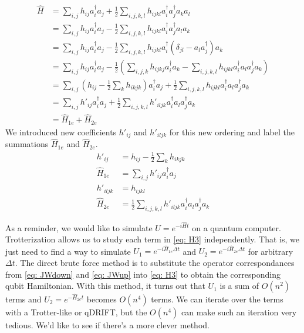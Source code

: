 \begin{equation}
    \begin{split}
        \hat{H} &= \sum_{i, j} h_{ij}a^\dag_ia_j + \frac{1}{2}\sum_{i,j,k,l} h_{ijkl}a^\dag_ia^\dag_ja_ka_l \\
        &= \sum_{i, j} h_{ij}a^\dag_ia_j - \frac{1}{2}\sum_{i,j,k,l} h_{ijkl}a^\dag_ia^\dag_ja_la_k \\
        &= \sum_{i, j} h_{ij}a^\dag_ia_j - \frac{1}{2}\sum_{i,j,k,l} h_{ijkl}a^\dag_i(\delta_{jl} - a_la^\dag_j)a_k \\
        &= \sum_{i, j} h_{ij}a^\dag_ia_j - \frac{1}{2}\left(\sum_{i, j, k}h_{ijkj}a^\dag_ia_k - \sum_{i,j,k,l} h_{ijkl}a^\dag_ia_la^\dag_ja_k\right) \\
        &= \sum_{i, j} (h_{ij} - \frac{1}{2}\sum_k h_{ikjk})a^\dag_ia_j + \frac{1}{2}\sum_{i,j,k,l} h_{ijkl}a^\dag_ia_la^\dag_ja_k \\
        &= \sum_{i, j} h'_{ij}a^\dag_ia_j + \frac{1}{2}\sum_{i,j,k,l} h'_{iljk}a^\dag_ia_la^\dag_ja_k \\
        &= \hat{H}_{1e} + \hat{H}_{2e}
    \end{split}
    \label{eq: H3}
\end{equation}
We introduced new coefficients $h'_{ij}$ and $h'_{iljk}$ for this new ordering and label the summations $\hat{H}_{1e}$ and $\hat{H}_{2e}$.
\begin{equation}
    \begin{split}
        h'_{ij} &= h_{ij} - \frac{1}{2}\sum_k h_{ikjk} \\
        \hat{H}_{1e} &= \sum_{i, j} h'_{ij}a^\dag_ia_j \\
        h'_{iljk} &= h_{ijkl} \\
        \hat{H}_{2e} &= \frac{1}{2}\sum_{i,j,k,l} h'_{iljk}a^\dag_ia_la^\dag_ja_k
    \end{split}
\end{equation}

As a reminder, we would like to simulate $U = e^{-i\hat{H}t}$ on a quantum computer. Trotterization allows us to study each term in \eqref{eq: H3} independently. That is, we just need to find a way to simulate $U_1 = e^{-i\hat{H}_{1e}\Delta t}$ and $U_2 = e^{-i\hat{H}_{2e}\Delta t}$ for arbitrary $\Delta t$. The direct brute force method is to substitute the operator correspondances from \eqref{eq: JWdown} and \eqref{eq: JWup} into \eqref{eq: H3} to obtain the corresponding qubit Hamiltonian. With this method, it turns out that $U_1$ is a sum of $O(n^2)$ terms and $U_2 = e^{-\hat{H}_{2e}t}$ becomes $O(n^4)$ terms. We can iterate over the terms with a Trotter-like or qDRIFT, but the $O(n^4)$ can make such an iteration very tedious. We'd like to see if there's a more clever method.

